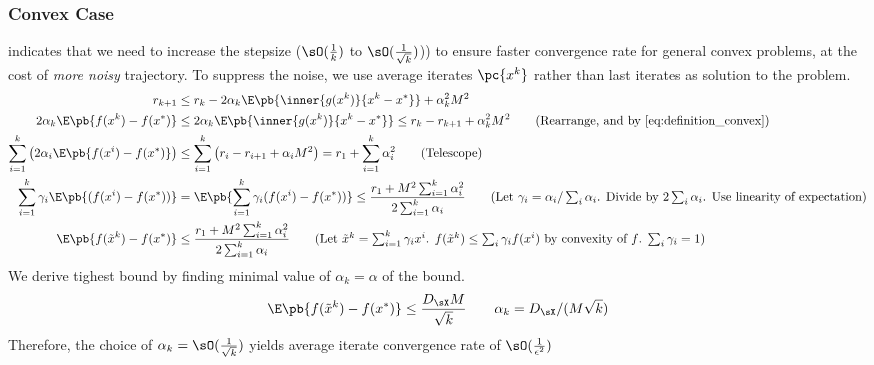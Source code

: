 \documentclass[11pt]{article}
\begin{document}
\subsubsection{Convex Case}

\cite{nemirovskiRobustStochasticApproximation2009} indicates that we need to increase the stepsize ($\sO(\frac{1}{k})$ to $\sO(\frac{1}{\sqrt{k}})$)) to ensure faster convergence rate for general convex problems, at the cost of \textit{more noisy} trajectory. To suppress the noise, we use average iterates $\pc{x^k}$ rather than last iterates as solution to the problem.
\begin{align*}
    r_{k+1}
        &\leq r_k - 2\alpha_k \E\pb{\inner{g(x^k)}{x^k-x^*}} + \alpha_k^2 M^2\\
    2\alpha_k \E\pb{ f(x^k) - f(x^*) }
        &\leq 2\alpha_k \E\pb{\inner{g(x^k)}{x^k - x^*}}
        \leq r_k - r_{k+1} + \alpha_k^2 M^2
            \tag{Rearrange, and by \ref{eq:definition_convex}} \\
    \sum_{i=1}^k \left( 2\alpha_i \E\pb{f(x^i) - f(x^*)} \right)
        &\leq \sum_{i=1}^k \left( r_i - r_{i+1} + \alpha_i M^2\right)
        = r_1 + \sum_{i=1}^k \alpha_i^2 
            \tag{Telescope} \\ 
    \sum_{i=1}^k \gamma_i \E\pb{(f(x^i) - f(x^*))}
        &= \E\pb{\sum_{i=1}^k \gamma_i (f(x^i) - f(x^*))}
        \leq \frac{r_1 + M^2 \sum_{i=1}^k \alpha_i^2}{2\sum_{i=1}^k \alpha_i}
            \tag{Let $\gamma_i = \alpha_i/\sum_i\alpha_i$. Divide by $2\sum_i\alpha_i$. Use linearity of expectation} \\
    \E\pb{f(\tilde{x}^k) - f(x^*)}
        &\leq \frac{r_1 + M^2 \sum_{i=1}^k \alpha_i^2}{2\sum_{i=1}^k \alpha_i}
            \tag{Let $\tilde{x}^k = \sum_{i=1}^k \gamma_i x^i$. $f(\tilde{x}^k)\leq \sum_i \gamma_i f(x^i)$ by convexity of $f$. $\sum_i\gamma_i = 1$}
\end{align*}
We derive tighest bound by finding minimal value of $\alpha_k = \alpha$ of the bound.
\[
    \E\pb{f(\tilde{x}^k) - f(x^*)}
        \leq \frac{D_{\sX}M}{\sqrt{k}}
        \quad\quad
        \alpha_k = D_{\sX} / (M\sqrt{k})
\]
Therefore, the choice of $\alpha_k = \sO(\frac{1}{\sqrt{k}})$ yields average iterate convergence rate of $\sO(\frac{1}{\epsilon^2})$


\printbibliography 
\end{document}
